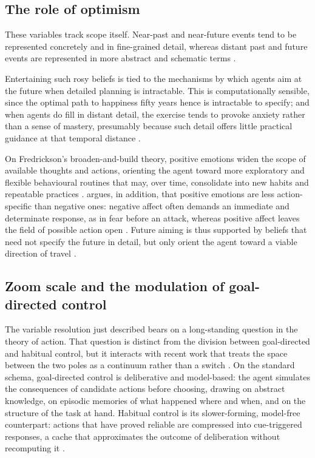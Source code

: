 \documentclass[11pt,a4paper]{article}
\begin{document}
\subsection{The role of optimism}\label{sec:optimism}

These variables track scope itself. Near-past and near-future events tend to be represented concretely and in fine-grained detail, whereas distant past and future events are represented in more abstract and schematic terms \citep{tropeliberman2010, lacortepiolino2016}. 

Entertaining such rosy beliefs is tied to the mechanisms by which agents aim at the future when detailed planning is intractable. This is computationally sensible, since the optimal path to happiness fifty years hence is intractable to specify; and when agents do fill in distant detail, the exercise tends to provoke anxiety rather than a sense of mastery, presumably because such detail offers little practical guidance at that temporal distance \citep{tropeliberman2010, sharot2011}.

 On Fredrickson's broaden-and-build theory, positive emotions widen the scope of available thoughts and actions, orienting the agent toward more exploratory and flexible behavioural routines that may, over time, consolidate into new habits and repeatable practices \citep{fredrickson2001, fredrickson2004, fredrickson2013, lenguyenfredrickson2017}. \citet{fredrickson2004} argues, in addition, that positive emotions are less action-specific than negative ones: negative affect often demands an immediate and determinate response, as in fear before an attack, whereas positive affect leaves the field of possible action open \citep{gableharmonjones2010}. Future aiming is thus supported by beliefs that need not specify the future in detail, but only orient the agent toward a viable direction of travel \citep{fisherhohwy2024, fisheretal2025}.

\subsection{Zoom scale and the modulation of goal-directed control}\label{sec:zoom}
The variable resolution just described bears on a long-standing question in the theory of action. That question is distinct from the division between goal-directed and habitual control, but it interacts with recent work that treats the space between the two poles as a continuum rather than a switch \citep{pezzulorigolichersi2013, fitzgeralddolanfriston2014, dolandayan2013}. On the standard schema, goal-directed control is deliberative and model-based: the agent simulates the consequences of candidate actions before choosing, drawing on abstract knowledge, on episodic memories of what happened where and when, and on the structure of the task at hand. Habitual control is its slower-forming, model-free counterpart: actions that have proved reliable are compressed into cue-triggered responses, a cache that approximates the outcome of deliberation without recomputing it \citep{fitzgeralddolanfriston2014, maistoetal2019}.
\end{document}

